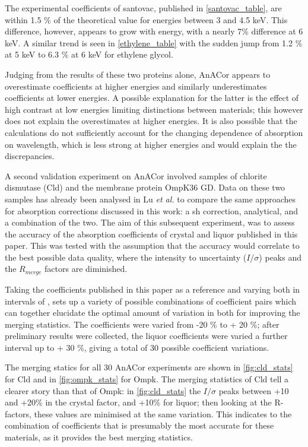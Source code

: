 The experimental coefficients of santovac, published in \cref{santovac_table}, are within 1.5 \% of the theoretical value for energies between 3 and 4.5 \unit{keV}. This difference, however, appears to grow with energy, with a nearly 7\% difference at 6 \unit{keV}. A similar trend is seen in \cref{ethylene_table} with the sudden jump from 1.2 \% at 5 \unit{keV} to 6.3 \% at 6 \unit{keV} for ethylene glycol.

Judging from the results of these two proteins alone, AnACor appears to overestimate coefficients at higher energies and similarly underestimates coefficients at lower energies. A possible explanation for the latter is the effect of high contrast at low energies limiting distinctions between materials; this however does not explain the overestimates at higher energies. It is also possible that the calculations do not sufficiently account for the changing dependence of absorption on wavelength, which is less strong at higher energies and would explain the the discrepancies.

A second validation experiment on AnACor involved samples of chlorite dismutase (Cld) and the membrane protein OmpK36 GD. Data on these two samples has already been analysed in Lu \textit{et al.} \cite{Lu} to compare the same approaches for absorption corrections discussed in this work: a \ac{sh} correction, analytical, and a combination of the two. The aim of this subsequent experiment, was to assess the accuracy of the absorption coefficients of crystal and liquor published in this paper. This was tested with the assumption that the accuracy would correlate to the best possible data quality, where the intensity to uncertainty ($I / \sigma$) peaks and the $R_{merge}$ factors are diminished.

Taking the coefficients published in this paper as a reference and varying both in intervals of , sets up a variety of possible combinations of coefficient pairs which can together elucidate the optimal amount of variation in both for improving the merging statistics. The coefficients were varied from -20 \% to + 20 \%; after preliminary results were collected, the liquor coefficients were varied a further interval up to + 30 \%, giving a total of 30 possible coefficient variations. %

The merging statics for all 30 AnACor experiments are shown in \cref{fig:cld_stats} for Cld and in \cref{fig:ompk_stats} for Ompk. The merging statistics of Cld tell a clearer story than that of Ompk: in \cref{fig:cld_stats} the $I/\sigma$ peaks between +10 and +20\% in the crystal factor, and +10\% for liquor; then looking at the R-factors, these values are minimised at the same variation. This indicates to the combination of coefficients that is presumably the most accurate for these materials, as it provides the best merging statistics.


